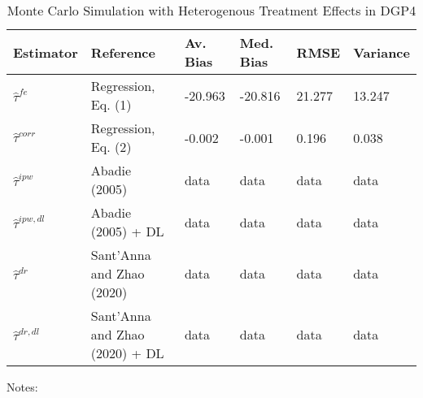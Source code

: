 \begin{table}[]
\centering
\begin{threeparttable}
\caption{Monte Carlo Simulation with Heterogenous Treatment Effects in DGP4}
\label{tab:table3}
\begin{tabular}{llllll}
\toprule
Estimator         & Reference                         & Av. Bias   & Med. Bias   & RMSE & Variance  \\ \midrule
\addlinespace
$\hat{\tau}^{fe}$ & Regression, Eq. (1)               & -20.963       & -20.816        & 21.277 & 13.247      \\
$\hat{\tau}^{corr}$ & Regression, Eq. (2)             & -0.002       & -0.001        & 0.196 & 0.038      \\
$\hat{\tau}^{ipw}$ & Abadie (2005)                    & data       & data        & data & data      \\
$\hat{\tau}^{ipw,dl}$ & Abadie (2005) + DL            & data       & data        & data & data      \\
$\hat{\tau}^{dr}$ & Sant'Anna and Zhao (2020)         & data       & data        & data & data      \\
$\hat{\tau}^{dr,dl}$ & Sant'Anna and Zhao (2020) + DL & data       & data        & data & data      \\

\bottomrule
\end{tabular}
\begin{tablenotes}
    \item Notes:
\end{tablenotes}
\end{threeparttable}
\end{table}
